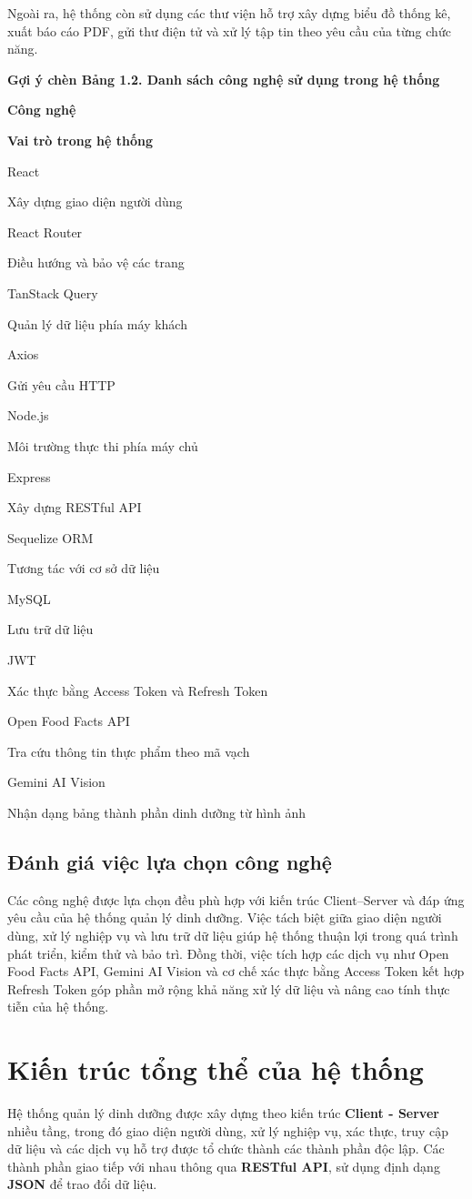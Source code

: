 \documentclass[12pt, a4paper]{report}
\begin{document}
Ngoài ra, hệ thống còn sử dụng các thư viện hỗ trợ xây dựng biểu đồ thống kê, xuất báo cáo PDF, gửi thư điện tử và xử lý tập tin theo yêu cầu của từng chức năng.

\textbf{Gợi ý chèn Bảng 1.2. Danh sách công nghệ sử dụng trong hệ thống}

\textbf{Công nghệ}

\textbf{Vai trò trong hệ thống}

React

Xây dựng giao diện người dùng

React Router

Điều hướng và bảo vệ các trang

TanStack Query

Quản lý dữ liệu phía máy khách

Axios

Gửi yêu cầu HTTP

Node.js

Môi trường thực thi phía máy chủ

Express

Xây dựng RESTful API

Sequelize ORM

Tương tác với cơ sở dữ liệu

MySQL

Lưu trữ dữ liệu

JWT

Xác thực bằng Access Token và Refresh Token

Open Food Facts API

Tra cứu thông tin thực phẩm theo mã vạch

Gemini AI Vision

Nhận dạng bảng thành phần dinh dưỡng từ hình ảnh

\subsection{Đánh giá việc lựa chọn công nghệ}Các công nghệ được lựa chọn đều phù hợp với kiến trúc Client–Server và đáp ứng yêu cầu của hệ thống quản lý dinh dưỡng. Việc tách biệt giữa giao diện người dùng, xử lý nghiệp vụ và lưu trữ dữ liệu giúp hệ thống thuận lợi trong quá trình phát triển, kiểm thử và bảo trì. Đồng thời, việc tích hợp các dịch vụ như Open Food Facts API, Gemini AI Vision và cơ chế xác thực bằng Access Token kết hợp Refresh Token góp phần mở rộng khả năng xử lý dữ liệu và nâng cao tính thực tiễn của hệ thống.

\section{Kiến trúc tổng thể của hệ thống}Hệ thống quản lý dinh dưỡng được xây dựng theo kiến trúc \textbf{Client - Server} nhiều tầng, trong đó giao diện người dùng, xử lý nghiệp vụ, xác thực, truy cập dữ liệu và các dịch vụ hỗ trợ được tổ chức thành các thành phần độc lập. Các thành phần giao tiếp với nhau thông qua \textbf{RESTful API}, sử dụng định dạng \textbf{JSON} để trao đổi dữ liệu.
\end{document}
